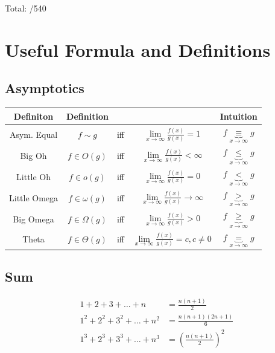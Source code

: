 \documentclass[a4paper, 12pt, addpoints]{exam}
\begin{document}

\begin{center}
Total:\; \fbox{ \begin{minipage}{1in} \hfill\vspace{1in} \end{minipage} }/540
\end{center}
\pagebreak
\section*{Useful Formula and Definitions}
\subsection*{Asymptotics}
\renewcommand{\arraystretch}{2}
\begin{center}
	\begin{tabular}{c |c c c | c}
		\hline\hline
		Definiton & Definition & & & Intuition\\
		\hline\hline  Asym. Equal & $f \sim g$ & iff & $\lim\limits_{x\to \infty} \frac{f(x)}{g(x)} = 1$  & $f \underbrace{\equiv}_{x \to \infty} g$\\ 
		Big Oh & $f \in O(g)$ & iff & $\lim\limits_{x\to \infty} \frac{f(x)}{g(x)} < \infty$ & $f \underbrace{\le}_{x \to \infty} g$  \\ 
		Little Oh  & $f \in o(g)$ & iff & $\lim\limits_{x\to \infty} \frac{f(x)}{g(x)} = 0$ & $f \underbrace{<}_{x \to \infty} g$ \\ 
		Little Omega & $f \in \omega(g)$ & iff & $\lim\limits_{x\to \infty} \frac{f(x)}{g(x)} \to \infty$ & $f \underbrace{>}_{x \to \infty} g$ \\ 
		Big Omega  & $f \in \Omega(g)$ & iff & $\lim\limits_{x\to \infty} \frac{f(x)}{g(x)} > 0 $ & $f \underbrace{\ge}_{x \to \infty} g$ \\ 
		Theta & $f \in \Theta(g)$ & iff & $\lim\limits_{x\to \infty} \frac{f(x)}{g(x)} =c, c\ne 0$ & $f \underbrace{=}_{x \to \infty} g$ \\ 
		\hline\hline 
	\end{tabular}
\end{center}
\subsection*{Sum}
\begin{align*}
	1 + 2 + 3 + \ldots + n &= \frac{n(n+1)}{2}\\
	1^2 + 2^2 + 3^2 + \ldots + n^2 &= \frac{n(n+1)(2n+1)}{6}\\
	1^3 + 2^3 + 3^3 + \ldots + n^3 &= \left(\frac{n(n+1)}{2}\right)^2
\end{align*}
\end{document}
